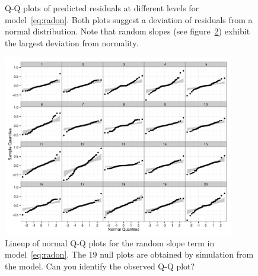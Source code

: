 \documentclass[12pt]{article} %
\begin{document}
\begin{figure}[!h]
	\centering
	\caption{\label{fig:qqplots1} Q-Q plots of predicted residuals at different levels %
	for model~\eqref{eq:radon}. Both plots suggest a deviation of residuals from a normal distribution. Note that random slopes (see figure~\ref{fig:lineup}) exhibit the largest deviation from normality. }
\end{figure}

\begin{figure}[htb]
	\centering
	\includegraphics[width=0.9\textwidth]{test.jpeg}%
	\caption{\label{fig:lineup} Lineup of normal Q-Q plots for the random slope term in model~\eqref{eq:radon}. The 19 null plots are obtained by simulation from the model. Can you identify the observed Q-Q plot? }
\end{figure}
\end{document}
